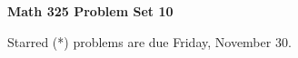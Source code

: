 \documentclass[12pt]{article}
\begin{document}
\def\ctln{\centerline}
\def\msk{\medskip}
\def\bsk{\bigskip}
\def\ssk{\smallskip}
\def\hsk{\hskip.3in}
\def\ra{\rightarrow}
\def\ubr{\underbar}
\def\dsp{\displaystyle}

\def\mt{{\mathcal T}}
\def\mb{{\mathcal B}}
\def\ms{{\mathcal S}}
\def\mu{{\mathcal U}}
\def\mv{{\mathcal V}}

\def\bbr{{\mathbb R}}
\def\bbz{{\mathbb Z}}
\def\bbq{{\mathbb Q}}
\def\bbn{{\mathbb N}}
\def\spc{$~$\hskip.15in$~$}

\def\sset{\subseteq}
\def\del{\partial}
\def\lra{$\Leftrightarrow$}
\def\bra{$\Rightarrow$}




\ctln{\bf Math 325 Problem Set 10}

\msk

\ctln{Starred (*) problems are due Friday, November 30.}
\end{document}
